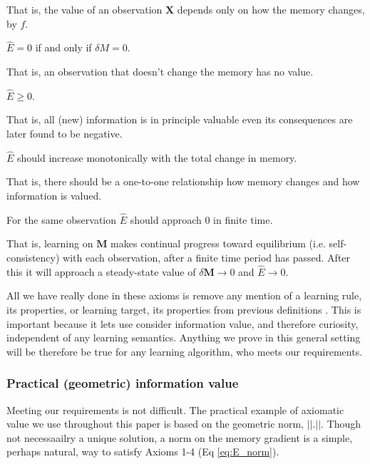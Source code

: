 That is, the value of an observation $\mathbf{X}$ depends only on how
the memory changes, by $f$. 

\begin{axiom}
	$\hat E = 0$ if and only if $\delta M = 0$. 
\end{axiom}

That is, an observation that doesn’t change the memory has no value.

\begin{axiom}
	$\hat E \ge 0$.
\end{axiom}

That is, all (new) information is in principle valuable even its consequences are later found to be negative.

\begin{axiom}
	$\hat E$ should increase monotonically with the total change in memory. 
\end{axiom}

That is, there should be a one-to-one relationship how memory changes and how information is valued.

\begin{axiom}
	For the same observation $\hat E$ should approach 0 in finite time.
\end{axiom}

That is, learning on $\mathbf{M}$ makes continual progress toward equilibrium (i.e. self-consistency) with each observation, after a finite time period has passed. After this it will approach a steady-state value of $\delta \mathbf{M} \rightarrow 0$ and $\hat E \rightarrow 0$.

All we have really done in these axioms is remove any mention of a learning rule, its properties, or learning target, its properties from previous definitions \cite{Itti2009,Jaegle2019,Schmidhuber1991,Inglis2001,Reddy2016,Pirolli2007}. This is important because it lets use consider information value, and therefore curiosity, independent of any learning semantics. Anything we prove in this general setting will be therefore be true for any learning algorithm, who meets our requirements. 

\subsubsection{Practical (geometric) information value}
Meeting our requirements is not difficult. The practical example of axiomatic value we use throughout this paper is based on the geometric norm, $||.||$. Though not necessaailry a unique solution, a norm on the memory gradient is a simple, perhaps natural, way to satisfy Axioms 1-4 (Eq \ref{eq:E_norm}). 

